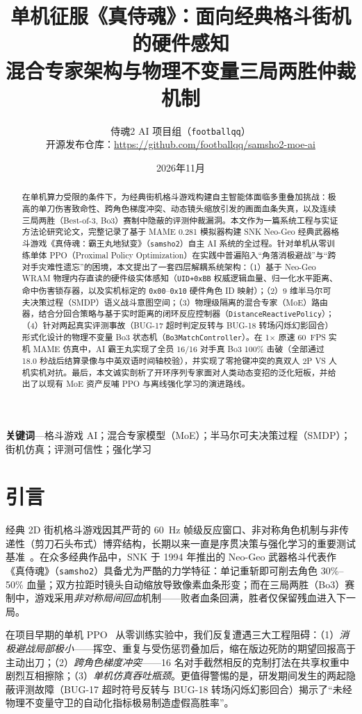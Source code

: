 \documentclass[10pt,twocolumn]{article}
\title{\Large\bfseries 单机征服《真侍魂》：面向经典格斗街机的硬件感知\\
混合专家架构与物理不变量三局两胜仲裁机制}
\author{侍魂2 AI 项目组（\texttt{footballqq}）\\
\small 开源发布仓库：\url{https://github.com/footballqq/samsho2-moe-ai}}
\date{2026年11月}
\begin{document}
\maketitle

\begin{abstract}
在单机算力受限的条件下，为经典街机格斗游戏构建自主智能体面临多重叠加挑战：极高的单刀伤害致命性、跨角色梯度冲突、动态镜头缩放引发的画面血条失真，以及连续三局两胜（Best-of-3, Bo3）赛制中隐蔽的评测仲裁漏洞。本文作为一篇系统工程与实证方法论研究论文，完整记录了基于 MAME 0.281 模拟器构建 SNK Neo-Geo 经典武器格斗游戏《真侍魂：霸王丸地狱变》（\texttt{samsho2}）自主 AI 系统的全过程。针对单机从零训练单体 PPO（Proximal Policy Optimization）在实践中普遍陷入“角落消极避战”与“跨对手灾难性遗忘”的困境，本文提出了一套四层解耦系统架构：（1）基于 Neo-Geo WRAM 物理内存直读的硬件级实体感知（\texttt{UID+0xBB} 权威逻辑血量、归一化水平距离、命中伤害锁存器，以及实机标定的 \texttt{0x00}--\texttt{0x10} 硬件角色 ID 映射）；（2）9 维半马尔可夫决策过程（SMDP）语义战斗意图空间；（3）物理级隔离的混合专家（MoE）路由器，结合分回合策略与基于实时距离的闭环反应控制器（\texttt{DistanceReactivePolicy}）；（4）针对两起真实评测事故（BUG-17 超时判定反转与 BUG-18 转场闪烁幻影回合）形式化设计的物理不变量 Bo3 状态机（\texttt{Bo3MatchController}）。在 1$\times$ 原速 60~FPS 实机 MAME 仿真中，AI 霸王丸实现了全员 16/16 对手真 Bo3 100\% 击破（全部通过 18.0 秒战后结算录像与中英双语时间轴校验），并实现了零抢键冲突的真双人 2P VS 人机实机对抗。最后，本文诚实剖析了开环序列专家面对人类动态变招的泛化短板，并给出了以现有 MoE 资产反哺 PPO 与离线强化学习的演进路线。
\end{abstract}

\noindent\textbf{关键词}---格斗游戏 AI；混合专家模型（MoE）；半马尔可夫决策过程（SMDP）；街机仿真；评测可信性；强化学习

\section{引言}
经典 2D 街机格斗游戏因其严苛的 60~Hz 帧级反应窗口、非对称角色机制与非传递性（剪刀石头布式）博弈结构，长期以来一直是序贯决策与强化学习的重要测试基准~\cite{lu2013fightingice,vinyals2019alphastar}。在众多经典作品中，SNK 于 1994 年推出的 Neo-Geo 武器格斗代表作《真侍魂》（\texttt{samsho2}）具备尤为严酷的力学特征：单记重斩即可削去角色 30\%--50\% 血量；双方拉距时镜头自动缩放导致像素血条形变；而在三局两胜（Bo3）赛制中，游戏采用\emph{非对称局间回血}机制——败者血条回满，胜者仅保留残血进入下一局。

在项目早期的单机 PPO~\cite{schulman2017ppo} 从零训练实验中，我们反复遭遇三大工程阻碍：（1）\emph{消极避战局部极小}——挥空、重复与受伤惩罚叠加后，缩在版边死防的期望回报高于主动出刀；（2）\emph{跨角色梯度冲突}——16 名对手截然相反的克制打法在共享权重中剧烈互相擦除；（3）\emph{单机仿真吞吐瓶颈}。更值得警惕的是，研发期间发生的两起隐蔽评测故障（BUG-17 超时符号反转与 BUG-18 转场闪烁幻影回合）揭示了“未经物理不变量守卫的自动化指标极易制造虚假高胜率”。
\end{document}
